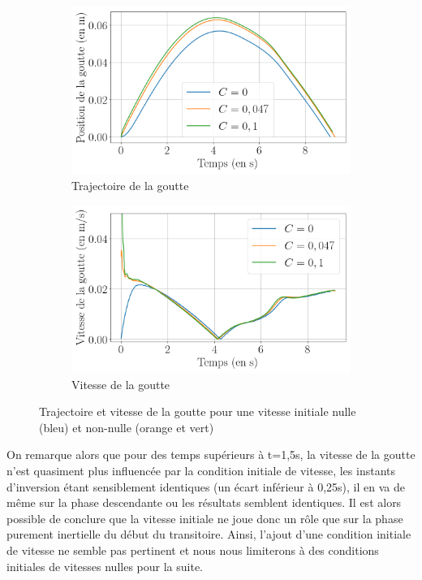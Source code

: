 \begin{figure}[H] 
	\centering
	\begin{subfigure}[H]{0.47\textwidth}
		\centering
		\includegraphics[width=\textwidth]{figure/influence_uinit_position.png}
		\caption{Trajectoire de la goutte}
		
	\end{subfigure} 
	\begin{subfigure}[H]{0.47\textwidth}
		\centering
		\includegraphics[width=\textwidth]{figure/influence_uinit_vitesse.png}
		\caption{Vitesse de la goutte}
	\end{subfigure}
	\caption{Trajectoire et vitesse de la goutte pour une vitesse initiale nulle (bleu) et non-nulle (orange et vert)}
	\label{fig:resultat_vitesse}
\end{figure}
On remarque alors que pour des temps supérieurs à t=1,5s, la vitesse de la goutte n'est quasiment plus influencée par la condition initiale de vitesse, les instants d'inversion étant sensiblement identiques (un écart inférieur à 0,25s), il en va de même sur la phase descendante ou les résultats semblent identiques. Il est alors possible de conclure que la vitesse initiale ne joue donc un rôle que sur la phase purement inertielle du début du transitoire. Ainsi, l'ajout d'une condition initiale de vitesse ne semble pas pertinent et nous nous limiterons à des conditions initiales de vitesses nulles pour la suite.


